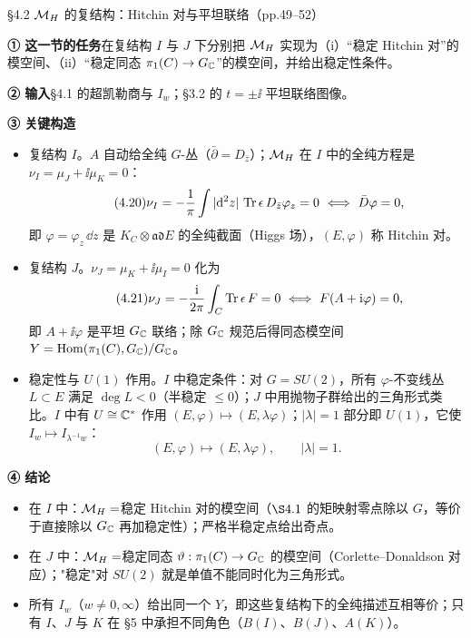 \begin{kcard}{§4.2 $\mathcal{M}_H$ 的复结构：Hitchin 对与平坦联络（pp.49--52）}

\noindent\textbf{① 这一节的任务}\quad 在复结构 $I$ 与 $J$ 下分别把 $\mathcal{M}_H$ 实现为（i）“稳定 Hitchin 对”的模空间、（ii）“稳定同态 $\pi_1(C)\to G_{\mathbb{C}}$”的模空间，并给出稳定性条件。\pA{}

\noindent\textbf{② 输入}\quad \S4.1 的超凯勒商与 $I_w$；\S3.2 的 $t=\pm\ii$ 平坦联络图像。

\noindent\textbf{③ 关键构造}\quad
\begin{itemize}
\item 复结构 $I$。$A$ 自动给全纯 $G$-丛（$\bar\partial=D_{\bar z}$）；$\mathcal{M}_H$ 在 $I$ 中的全纯方程是 $\nu_I=\mu_J+\ii\mu_K=0$：
\begin{equation}\label{l1:nuI}\tag{4.20}
\nu_I=-\frac{1}{\pi}\int|\mathrm{d}^2z|\,\operatorname{Tr}\epsilon\,D_{\bar z}\varphi_z=0
\ \Longleftrightarrow\ \bar D\varphi=0 ,
\end{equation}
即 $\varphi=\varphi_z\,\dd z$ 是 $K_C\otimes\mathfrak{ad}E$ 的全纯截面（Higgs 场），$(E,\varphi)$ 称 Hitchin 对。\pA{}
\item 复结构 $J$。$\nu_J=\mu_K+\ii\mu_I=0$ 化为
\begin{equation}\label{l1:nuJ}\tag{4.21}
\nu_J=-\frac{\mathrm{i}}{2\pi}\int_C\operatorname{Tr}\epsilon\,F=0
\ \Longleftrightarrow\ F(A+\mathrm{i}\varphi)=0 ,
\end{equation}
即 $A+\ii\varphi$ 是平坦 $G_{\mathbb{C}}$ 联络；除 $G_{\mathbb{C}}$ 规范后得同态模空间 $Y=\operatorname{Hom}(\pi_1(C),G_{\mathbb{C}})/G_{\mathbb{C}}$。\pA{}
\item 稳定性与 $U(1)$ 作用。$I$ 中稳定条件：对 $G=SU(2)$，所有 $\varphi$-不变线丛 $L\subset E$ 满足 $\deg L<0$（半稳定 $\le0$）；$J$ 中用抛物子群给出的三角形式类比。$I$ 中有 $U\cong\mathbb{C}^*$ 作用 $(E,\varphi)\mapsto(E,\lambda\varphi)$；$|\lambda|=1$ 部分即 $U(1)$，它使 $I_w\mapsto I_{\lambda^{-1}w}$：
\begin{equation}\label{l1:u1c}\tag{4.23}
(E,\varphi)\longmapsto(E,\lambda\varphi),\qquad |\lambda|=1 .
\end{equation}
\pA{}
\end{itemize}

\noindent\textbf{④ 结论}\quad
\begin{itemize}
\item 在 $I$ 中：$\mathcal{M}_H=$稳定 Hitchin 对的模空间（$\S4.1$ 的矩映射零点除以 $G$，等价于直接除以 $G_{\mathbb{C}}$ 再加稳定性）；严格半稳定点给出奇点。\pA{}
\item 在 $J$ 中：$\mathcal{M}_H=$稳定同态 $\vartheta:\pi_1(C)\to G_{\mathbb{C}}$ 的模空间（Corlette--Donaldson 对应）；"稳定"对 $SU(2)$ 就是单值不能同时化为三角形式。\pA{}
\item 所有 $I_w$（$w\ne0,\infty$）给出同一个 $Y$，即这些复结构下的全纯描述互相等价；只有 $I$、$J$ 与 $K$ 在 \S5 中承担不同角色（$B(I)$、$B(J)$、$A(K)$）。\pA{}
\end{itemize}


\end{kcard}
